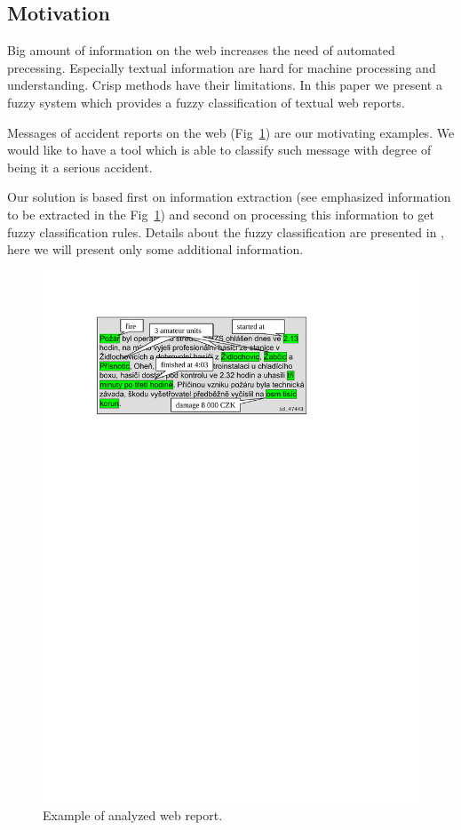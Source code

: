 \begin{multicols}{2}
\subsection{Motivation}
Big amount of information on the web increases the need of automated precessing. Especially textual information are hard for machine processing and understanding. Crisp methods have their limitations. In this paper we present a fuzzy system which provides a fuzzy classification of textual web reports. 

Messages of accident reports on the web (Fig~\ref{dedek:message}) are our motivating examples. We would like to have a tool which is able to classify such message with degree of being it a serious accident. 

Our solution is based first on information extraction (see emphasized information to be extracted in the Fig~\ref{dedek:message}) and second on processing this information to get fuzzy classification rules. Details about the fuzzy classification are presented in \cite{Dedek:FuzzWI}, here we will present only some additional information.

\begin{figure}
\centerline{\includegraphics[width=\hsize]{img/message}}
\caption{Example of analyzed web report.}
\label{dedek:message}
\end{figure}



\end{multicols}
